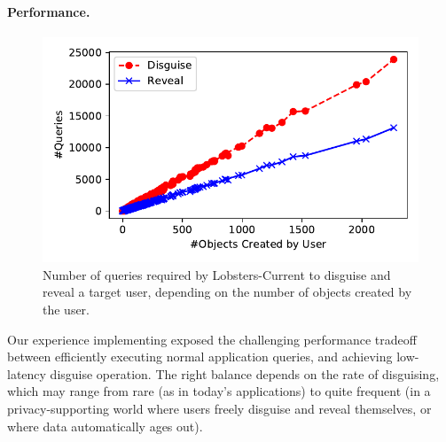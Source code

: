 
\paragraph{Performance.}
\label{sec:perf}

\begin{figure}[t!]
    \centerline{\includegraphics[width=.5\textwidth]{img/perf}}
    \vspace{-\baselineskip}
    \caption{Number of queries required by Lobsters-Current to disguise and reveal a target user, depending on the number of
    objects created by the user.}
    \label{fig:latencies}
    \vspace{-\baselineskip}
\end{figure}

Our experience implementing \sys exposed the challenging performance tradeoff between efficiently
executing normal application queries, and achieving low-latency disguise operation. The right
balance depends on the rate of disguising, which may range from rare (as in today's applications)
to quite frequent (in a privacy-supporting world where users freely disguise and reveal themselves,
or where data automatically ages out).

